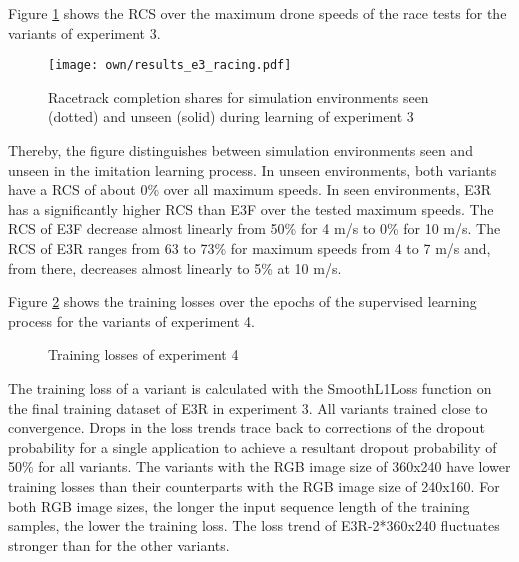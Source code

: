 Figure \ref{fig:e3_racing} shows the 
RCS over the maximum drone speeds
of the race tests for the variants of experiment 3.
\begin{figure}
    \centering
    \texttt{[image: own/results\_e3\_racing.pdf]}
    \caption[
        Racetrack completion shares of experiment 3
    ]{
        Racetrack completion shares
        for simulation environments
        seen (dotted) and unseen (solid) during learning
        of experiment 3
    \label{fig:e3_racing}}
\end{figure}
Thereby, the figure 
distinguishes between simulation environments seen and unseen in the imitation learning process.
In unseen environments, both variants have a RCS of about 0\% over all maximum speeds.
In seen environments,
E3R has a significantly higher RCS than E3F over the tested maximum speeds.
The RCS of E3F decrease almost linearly from 50\% for 4 m/s
to 0\% for 10 m/s.
The RCS of E3R ranges from 63 to 73\% for maximum speeds from 4 to 7 m/s
and, from there, decreases almost linearly to 5\% at 10 m/s.





Figure \ref{fig:e4_learn} shows the 
training losses over the epochs of the supervised learning process for the variants of experiment 4.
\begin{figure}
    \centering
    \hspace*{0cm}
    \par
    \caption[
        Training losses of experiment 4
    ]{
        Training losses of experiment 4
        \label{fig:e4_learn}
    }
\end{figure}
The training loss of a variant is calculated 
with the SmoothL1Loss function
on the final training dataset of E3R in experiment 3.
All variants trained close to convergence.
Drops in the loss trends trace back to corrections
of the dropout probability for a single application
to achieve a resultant dropout probability of 50\% for all variants.
The variants with the RGB image size of 360x240 
have lower training losses than their counterparts 
with the RGB image size of 240x160.
For both RGB image sizes, the longer the input sequence length 
of the training samples, the lower the training loss.
The loss trend of E3R-2*360x240 fluctuates stronger than for the other variants.




